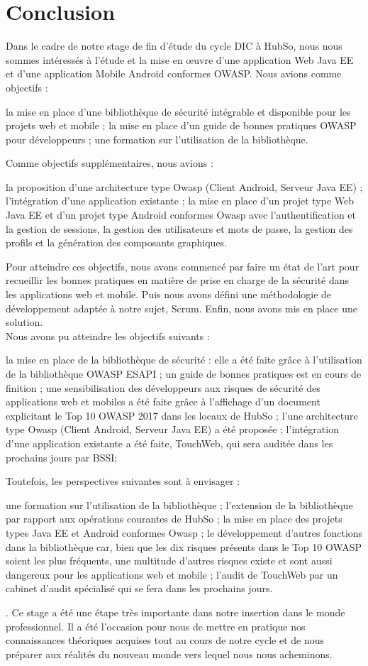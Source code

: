 \chapter*{Conclusion}
Dans le cadre de notre stage de fin d’étude du cycle DIC à HubSo, nous nous sommes intéressés à l'étude et la mise en œuvre d'une application Web Java EE et d'une application Mobile Android conformes OWASP. Nous avions comme objectifs : 
\begin{itemize}
	\itemtirait la mise en place d'une bibliothèque de sécurité intégrable et disponible pour les projets web et mobile ;
	\itemtirait la mise en place d'un guide de bonnes pratiques OWASP pour développeurs ;
	\itemtirait une formation sur l'utilisation de la bibliothèque.
\end{itemize}
Comme objectifs supplémentaires, nous avions :
\begin{itemize}
	\itemtirait la proposition d'une architecture type Owasp (Client Android, Serveur Java EE) ;
	\itemtirait l'intégration d'une application existante ;
	\itemtirait la mise en place d'un projet type Web Java EE et d'un projet type Android conformes Owasp avec l'authentification et la gestion de sessions, la gestion des utilisateurs et mots de passe, la gestion des profils et la génération des composants graphiques.
\end{itemize}
Pour atteindre ces objectifs, nous avons commencé par faire un état de l’art pour recueillir les bonnes pratiques en matière de prise en charge de la sécurité dans les applications web et mobile. Puis nous avons défini une méthodologie de développement adaptée à notre sujet, Scrum. Enfin, nous avons mis en place une solution. \\
Nous avons pu atteindre les objectifs suivants :
\begin{itemize}
	\itemcheck la mise en place de la bibliothèque de sécurité : elle a été faite grâce à l'utilisation de la bibliothèque OWASP ESAPI ;
	\itemcheck un guide de bonnes pratiques est en cours de finition ;
	\itemcheck une sensibilisation des développeurs aux risques de sécurité des applications web et mobiles a été faite grâce à l'affichage d'un document explicitant le Top 10 OWASP 2017 dans les locaux de HubSo ;
	\itemcheck l'une architecture type Owasp (Client Android, Serveur Java EE) a été proposée ;
	\itemcheck l'intégration d'une application existante a été faite, TouchWeb, qui sera auditée dans les prochains jours par BSSI;
\end{itemize}
Toutefois, les perspectives suivantes sont à envisager :
\begin{itemize}
	\itemtirait une formation sur l'utilisation de la bibliothèque ;
	\itemtirait l'extension de la bibliothèque par rapport aux opérations courantes de HubSo ;
	\itemtirait la mise en place des projets types Java EE et Android conformes Owasp ;
	\itemtirait le développement d'autres fonctions dans la bibliothèque car, bien que les dix risques présents dans le Top 10 OWASP soient les plus fréquents, une multitude d'autres risques existe et sont aussi dangereux pour les applications web et mobile ;
	\itemtirait l'audit de TouchWeb par un cabinet d'audit spécialisé qui se fera dans les prochains jours.
\end{itemize}.
Ce stage a été une étape très importante dans notre insertion dans le monde professionnel. Il a été l’occasion pour nous de mettre en pratique nos connaissances théoriques acquises tout au cours de notre cycle et de nous préparer aux réalités du nouveau monde vers lequel nous nous acheminons.